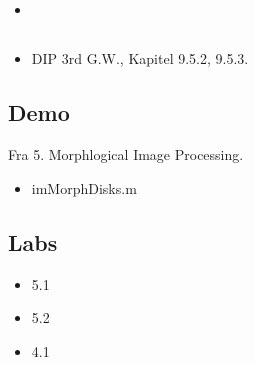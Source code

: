 \subsection{\subtopics}

\begin{itemize}
	\item 
\end{itemize}

\subsection{\curriculum}

\begin{itemize}
	\item DIP 3rd G.W., Kapitel 9.5.2, 9.5.3.
\end{itemize}

\subsection{Demo}

Fra 5. Morphlogical Image Processing.

\begin{itemize}
	\item imMorphDisks.m
\end{itemize}

\subsection{Labs}

\begin{itemize}
	\item 5.1
	\item 5.2
	\item 4.1
\end{itemize}